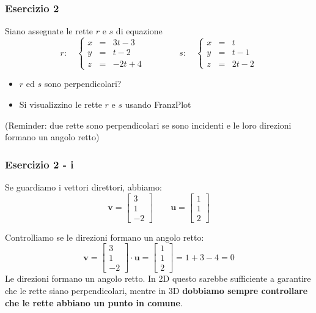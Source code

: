 \documentclass{beamer}
\newcommand{\frnzplt}{FranzPlot }
\begin{document}
\begin{frame}
\frametitle{Esercizio 2}

Siano assegnate le rette $r$ e $s$ di equazione
$$
r: \quad \left\{
\begin{array}{lcr}
x&=&3t-3\\
y&=&t-2\\
    z&=&-2t+4
\end{array}
\right. \qquad \qquad s: \quad \left\{
\begin{array}{lcr}
x&=&t\\
y&=&t-1\\
z&=&2t-2
\end{array}
\right.
$$

    \begin{itemize}
    \item $r$ ed $s$ sono perpendicolari? 
    \item Si visualizzino le rette $r$ e $s$ usando \frnzplt
    \end{itemize}
    
    \vspace{0.75cm}
    (Reminder: due rette sono perpendicolari se sono incidenti e le loro direzioni formano un angolo retto)
\end{frame}

\begin{frame}
\frametitle{Esercizio 2 - i}

Se guardiamo i vettori direttori, abbiamo:
$$
\mathbf{v} = \left[
\begin{array}{c}
3\\
1\\
-2
\end{array}
\right]
\qquad
    \mathbf{u} = \left[
\begin{array}{c}
1\\
1\\
2
\end{array}
\right]
$$

Controlliamo se le direzioni formano un angolo retto:
$$
\mathbf{v} = \left[
\begin{array}{c}
3\\
1\\
-2
\end{array}
\right]
\cdot
    \mathbf{u} = \left[
\begin{array}{c}
1\\
1\\
2
\end{array}
\right]
= 1 + 3 - 4 = 0
$$
Le direzioni formano un angolo retto.
In 2D questo sarebbe sufficiente a garantire che le rette siano perpendicolari,
mentre in 3D \textbf{dobbiamo sempre controllare che le rette abbiano un punto in comune}.

\end{frame}
\end{document}
